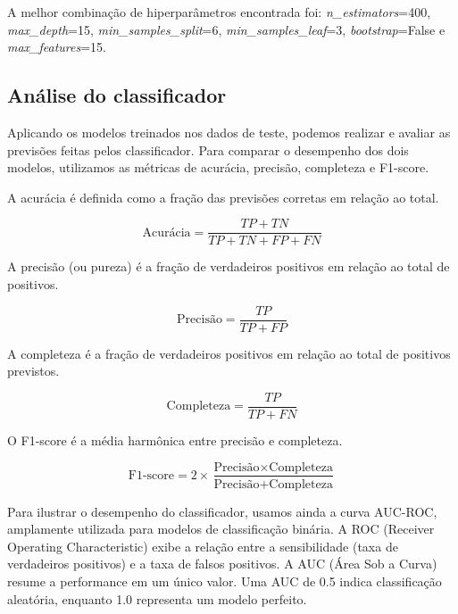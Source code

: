 A melhor combinação de hiperparâmetros encontrada foi: \textit{n\_estimators}=400, \textit{max\_depth}=15, \textit{min\_samples\_split}=6, \textit{min\_samples\_leaf}=3, \textit{bootstrap}=False e \textit{max\_features}=15.



\subsection{Análise do classificador}\label{subsec:analise_modelo}
Aplicando os modelos treinados nos dados de teste, podemos realizar e avaliar as previsões feitas pelos classificador. Para comparar o desempenho dos dois modelos, utilizamos as métricas de acurácia, precisão, completeza e F1-score.

A acurácia é definida como a fração das previsões corretas em relação ao total. 

\begin{equation}
    \text{Acurácia} = \frac{TP + TN}{TP + TN + FP + FN}
\end{equation}

A precisão (ou pureza) é a fração de verdadeiros positivos em relação ao total de positivos. 

\begin{equation}
    \text{Precisão} = \frac{TP}{TP + FP}
    \label{eq:precisao}
\end{equation}

A completeza é a fração de verdadeiros positivos em relação ao total de positivos previstos.

\begin{equation}
    \text{Completeza} = \frac{TP}{TP + FN}
    \label{eq:completeza}
\end{equation}

O F1-score é a média harmônica entre precisão e completeza.

\begin{equation}
    \text{F1-score} = 2 \times \frac{\text{Precisão} \times \text{Completeza}}{\text{Precisão} + \text{Completeza}}
\end{equation}

Para ilustrar o desempenho do classificador, usamos ainda a curva AUC-ROC, amplamente utilizada para modelos de classificação binária. A ROC (Receiver Operating Characteristic) exibe a relação entre a sensibilidade (taxa de verdadeiros positivos) e a taxa de falsos positivos. A AUC (Área Sob a Curva) resume a performance em um único valor. Uma AUC de 0.5 indica classificação aleatória, enquanto 1.0 representa um modelo perfeito.

